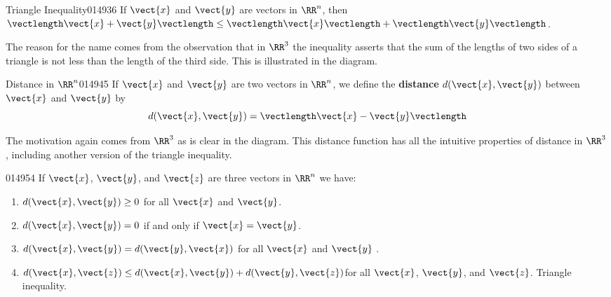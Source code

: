 \begin{corollary}{Triangle Inequality}{014936}
If $\vect{x}$ and $\vect{y}$ are vectors in $\RR^n$, then $\vectlength\vect{x} + \vect{y}\vectlength \leq \vectlength\vect{x}\vectlength + \vectlength\vect{y}\vectlength$.
\end{corollary}

\begin{wrapfigure}[4]{l}{5cm} 
\vspace{-2em}
\centering

\end{wrapfigure} 

The reason for the name comes from the observation that in $\RR^3$ the inequality asserts that the sum of the lengths of two sides of a triangle is not less than the length of the third side. This is illustrated in the diagram.
\vspace{2em}

\begin{definition}{Distance in $\RR^n$}{014945} %
If $\vect{x}$ and $\vect{y}$ are two vectors in $\RR^n$, we define the \textbf{distance} $d(\vect{x}, \vect{y})$ between $\vect{x}$ and $\vect{y}$ by
\begin{equation*}
d(\vect{x},\vect{y}) = \vectlength\vect{x} - \vect{y}\vectlength
\end{equation*}
\end{definition}

\begin{wrapfigure}[3]{l}{5cm} 
  \vspace*{-2em}
	\centering
	
\end{wrapfigure}

The motivation again comes from $\RR^3$ as is clear in the diagram. This distance function has all the intuitive properties of distance in $\RR^3$, including another version of the triangle inequality.
\vspace{1em}

\begin{theorem}{}{014954} %
If $\vect{x}$, $\vect{y}$, and $\vect{z}$ are three vectors in $\RR^n$ we have:

\begin{enumerate}
\item $d(\vect{x}, \vect{y}) \geq 0$ for all $\vect{x}$ and $\vect{y}$.

\item $d(\vect{x}, \vect{y}) = 0$ if and only if $\vect{x} = \vect{y}$.

\item $d(\vect{x}, \vect{y}) = d(\vect{y}, \vect{x})$ for all $\vect{x}$ and $\vect{y}$ .

\item $d(\vect{x}, \vect{z}) \leq d(\vect{x}, \vect{y}) + d(\vect{y}, \vect{z})$for all $\vect{x}$, $\vect{y}$, and $\vect{z}$. \quad Triangle inequality.
\end{enumerate}
\end{theorem}

